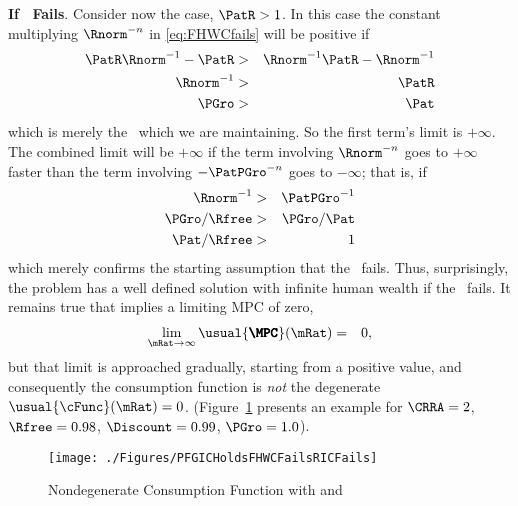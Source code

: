 \documentclass[./BufferStockTheory.tex]{subfiles}
\begin{document}
{\bf If \RIC~Fails}.  Consider now the \cncl{\RIC} case, $\PatR > 1$.  In this case the constant multiplying
$\Rnorm^{-n}$ in \eqref{eq:FHWCfails} will be positive if
\begin{eqnarray*}
  \PatR \Rnorm^{-1} - \PatR & > &  \Rnorm^{-1}\PatR-\Rnorm^{-1}
\\ \Rnorm^{-1} & > & \PatR
\\ \PGro & > & \Pat
\end{eqnarray*}
which is merely the \GICRaw~which we are maintaining.  So the first term's limit is $+\infty$.  The
combined limit will be $+\infty$ if the term involving $\Rnorm^{-n}$
goes to $+\infty$ faster than the term involving $-\PatPGro^{-n}$ goes to
$-\infty$; that is, if
\begin{eqnarray*}
  \Rnorm^{-1} & > & \PatPGro^{-1}
\\ \PGro/\Rfree & > & \PGro/\Pat
\\ \Pat/\Rfree & > & 1
\end{eqnarray*}
which merely confirms the starting assumption that the \RIC~fails.
Thus, surprisingly, the problem has a well defined solution with
infinite human wealth if the \RIC~fails.  It remains true that \cncl{\RIC}
implies a limiting MPC of zero,
\begin{eqnarray}
  \lim_{\mRat \rightarrow \infty} \usual{\pmb{\MPC}}(\mRat)  & = & 0,
\end{eqnarray}
but that limit is approached gradually, starting from a positive
value, and consequently the consumption function is {\it not} the
degenerate $\usual{\cFunc}(\mRat)=0$.  (Figure~\ref{fig:PFGICHoldsFHWCFailsRICFails} presents an example for $\CRRA=2$, $\Rfree=0.98$, $\Discount = 0.99$, $\PGro = 1.0$).

\begin{figure}
\centerline{\texttt{[image: ./Figures/PFGICHoldsFHWCFailsRICFails]}}
\caption{Nondegenerate Consumption Function with \cncl{\FHWC} and \cncl{\RIC}}
\label{fig:PFGICHoldsFHWCFailsRICFails}
\end{figure}
\end{document}
